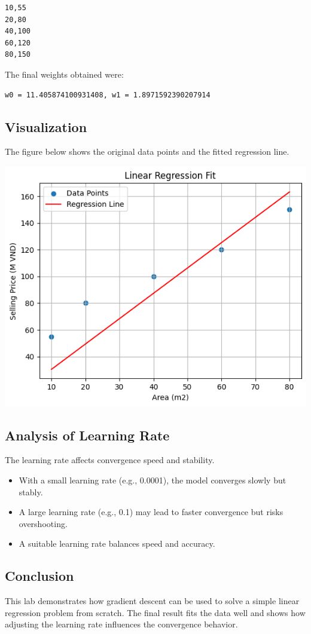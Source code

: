 \documentclass[12pt]{article}
\begin{document}
\begin{verbatim}
10,55
20,80
40,100
60,120
80,150
\end{verbatim}

\noindent 
The final weights obtained were:

\begin{verbatim}
w0 = 11.405874100931408, w1 = 1.8971592390207914
\end{verbatim}

\subsection{Visualization}
The figure below shows the original data points and the fitted regression line.

\begin{center}
    \includegraphics[scale=0.7]{output.png}
\end{center}

\subsection{Analysis of Learning Rate}
The learning rate affects convergence speed and stability.

\begin{itemize}
    \item With a small learning rate (e.g., 0.0001), the model converges slowly but stably.
    \item A large learning rate (e.g., 0.1) may lead to faster convergence but risks overshooting.
    \item A suitable learning rate balances speed and accuracy.
\end{itemize}

\subsection{Conclusion}
This lab demonstrates how gradient descent can be used to solve a simple linear regression problem from scratch. The final result fits the data well and shows how adjusting the learning rate influences the convergence behavior.
\end{document}
